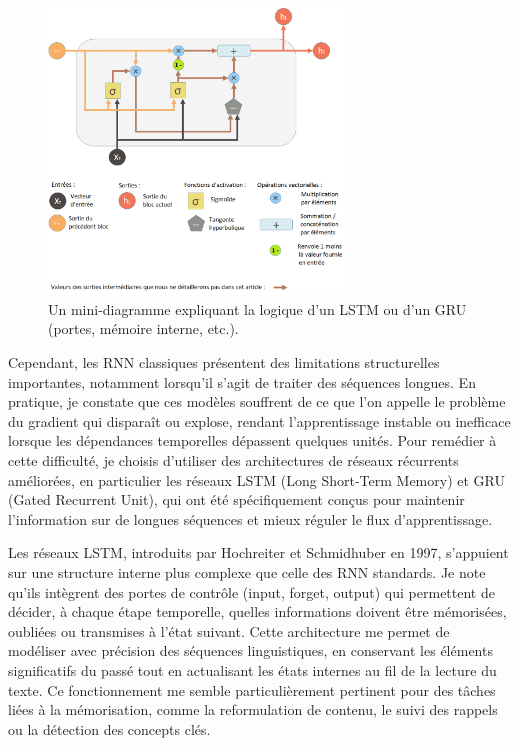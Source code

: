 \documentclass[11pt,a4paper]{report}
\begin{document}
\begin{figure}[h]
    \centering
    \includegraphics[width=0.7\textwidth]{images/3.1.2.png}
    \caption{Un mini-diagramme expliquant la logique d’un LSTM ou d’un GRU (portes, mémoire interne, etc.).}
    \label{fig:3.1.2}
\end{figure}

Cependant, les RNN classiques présentent des limitations structurelles importantes, notamment lorsqu’il s’agit de traiter des séquences longues. En pratique, je constate que ces modèles souffrent de ce que l’on appelle le problème du gradient qui disparaît ou explose, rendant l’apprentissage instable ou inefficace lorsque les dépendances temporelles dépassent quelques unités. Pour remédier à cette difficulté, je choisis d’utiliser des architectures de réseaux récurrents améliorées, en particulier les réseaux LSTM (Long Short-Term Memory) et GRU (Gated Recurrent Unit), qui ont été spécifiquement conçus pour maintenir l’information sur de longues séquences et mieux réguler le flux d’apprentissage.

Les réseaux LSTM, introduits par Hochreiter et Schmidhuber en 1997, s’appuient sur une structure interne plus complexe que celle des RNN standards. Je note qu’ils intègrent des portes de contrôle (input, forget, output) qui permettent de décider, à chaque étape temporelle, quelles informations doivent être mémorisées, oubliées ou transmises à l’état suivant. Cette architecture me permet de modéliser avec précision des séquences linguistiques, en conservant les éléments significatifs du passé tout en actualisant les états internes au fil de la lecture du texte. Ce fonctionnement me semble particulièrement pertinent pour des tâches liées à la mémorisation, comme la reformulation de contenu, le suivi des rappels ou la détection des concepts clés.
\end{document}
